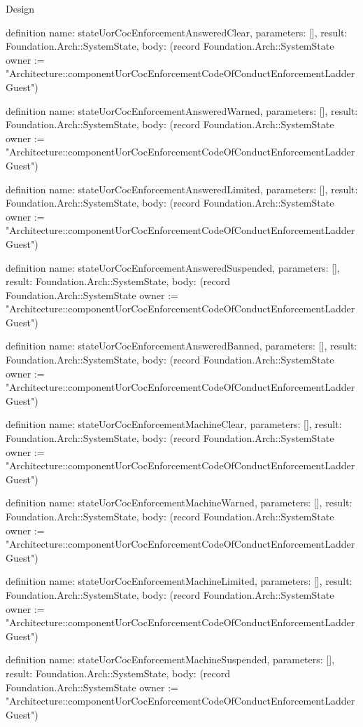 \begin{lexlean}{Design}
\begin{semanticmodule}
definition{
  name: stateUorCocEnforcementAnsweredClear,
  parameters: [],
  result: Foundation.Arch::SystemState,
  body: (record Foundation.Arch::SystemState {owner := "Architecture::componentUorCocEnforcementCodeOfConductEnforcementLadderGuest"})
}

definition{
  name: stateUorCocEnforcementAnsweredWarned,
  parameters: [],
  result: Foundation.Arch::SystemState,
  body: (record Foundation.Arch::SystemState {owner := "Architecture::componentUorCocEnforcementCodeOfConductEnforcementLadderGuest"})
}

definition{
  name: stateUorCocEnforcementAnsweredLimited,
  parameters: [],
  result: Foundation.Arch::SystemState,
  body: (record Foundation.Arch::SystemState {owner := "Architecture::componentUorCocEnforcementCodeOfConductEnforcementLadderGuest"})
}

definition{
  name: stateUorCocEnforcementAnsweredSuspended,
  parameters: [],
  result: Foundation.Arch::SystemState,
  body: (record Foundation.Arch::SystemState {owner := "Architecture::componentUorCocEnforcementCodeOfConductEnforcementLadderGuest"})
}

definition{
  name: stateUorCocEnforcementAnsweredBanned,
  parameters: [],
  result: Foundation.Arch::SystemState,
  body: (record Foundation.Arch::SystemState {owner := "Architecture::componentUorCocEnforcementCodeOfConductEnforcementLadderGuest"})
}

definition{
  name: stateUorCocEnforcementMachineClear,
  parameters: [],
  result: Foundation.Arch::SystemState,
  body: (record Foundation.Arch::SystemState {owner := "Architecture::componentUorCocEnforcementCodeOfConductEnforcementLadderGuest"})
}

definition{
  name: stateUorCocEnforcementMachineWarned,
  parameters: [],
  result: Foundation.Arch::SystemState,
  body: (record Foundation.Arch::SystemState {owner := "Architecture::componentUorCocEnforcementCodeOfConductEnforcementLadderGuest"})
}

definition{
  name: stateUorCocEnforcementMachineLimited,
  parameters: [],
  result: Foundation.Arch::SystemState,
  body: (record Foundation.Arch::SystemState {owner := "Architecture::componentUorCocEnforcementCodeOfConductEnforcementLadderGuest"})
}

definition{
  name: stateUorCocEnforcementMachineSuspended,
  parameters: [],
  result: Foundation.Arch::SystemState,
  body: (record Foundation.Arch::SystemState {owner := "Architecture::componentUorCocEnforcementCodeOfConductEnforcementLadderGuest"})
}


\end{semanticmodule}
\end{lexlean}
